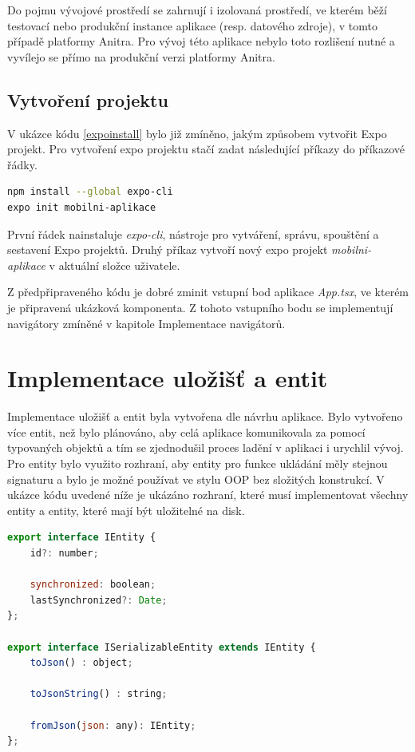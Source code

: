 Do pojmu vývojové prostředí se zahrnují i izolovaná prostředí, ve kterém běží testovací nebo produkční instance aplikace (resp. datového zdroje), v tomto případě platformy Anitra. Pro vývoj této aplikace nebylo toto rozlišení nutné a vyvílejo se přímo na produkční verzi platformy Anitra.

\subsection{Vytvoření projektu}

V ukázce kódu \ref{expoinstall} bylo již zmíněno, jakým způsobem vytvořit Expo projekt. Pro vytvoření expo projektu stačí zadat následující příkazy do příkazové řádky.

\begin{lstlisting}[language=Bash, caption=Vytvoření nového projektu]
npm install --global expo-cli
expo init mobilni-aplikace
\end{lstlisting}

První řádek nainstaluje \emph{expo-cli}, nástroje pro vytváření, správu, spouštění a sestavení Expo projektů. Druhý příkaz vytvoří nový expo projekt \emph{mobilni-aplikace} v aktuální složce uživatele.

Z předpřipraveného kódu je dobré zminit vstupní bod aplikace \emph{App.tsx}, ve kterém je připravená ukázková komponenta. Z tohoto vstupního bodu se implementují navigátory zmíněné v kapitole Implementace navigátorů.

\section{Implementace uložišť a entit}

Implementace uložišť a entit byla vytvořena dle návrhu aplikace. Bylo vytvořeno více entit, než bylo plánováno, aby celá aplikace komunikovala za pomocí typovaných objektů a tím se zjednodušil proces ladění v aplikaci i urychlil vývoj. Pro entity bylo využito rozhraní, aby entity pro funkce ukládání měly stejnou signaturu a bylo je možné používat ve stylu OOP bez složitých konstrukcí. V ukázce kódu uvedené níže je ukázáno rozhraní, které musí implementovat všechny entity a entity, které mají být uložitelné na disk.

\begin{lstlisting}[language=JavaScript, caption=Ukázka entity]
export interface IEntity {
	id?: number;
	
	synchronized: boolean;
	lastSynchronized?: Date;
};

export interface ISerializableEntity extends IEntity {
	toJson() : object;
	
	toJsonString() : string;
	
	fromJson(json: any): IEntity;
};
\end{lstlisting}

